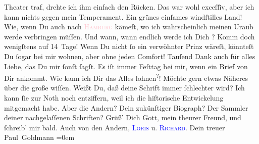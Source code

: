                Theater traf, drehte ich ihm einfach den Rücken. Das war wohl exceſſiv, aber ich kann
               nichts gegen mein Temperament.\pend
           \pstart
           Ein grünes einſames windſtilles Land! Wie, wenn Du auch nach \textsc{\textcolor{pink}{Hamburg}{}\ledrightnote{\textcolor{pink}{Hamburg}}} kämeſt, wo ich wahrscheinlich meinen Uraub werde verbringen müſſen. Und wann,
               wann endlich werde ich Dich \label{K_L02619-6v}\label{K_L02619-6h}? Komm doch
               wenigſtens auf 14 Tage! Wenn Du nicht ſo ein verwöhnter Prinz wäreſt, könnteſt Du
               ſogar bei mir wohnen, aber ohne jeden Comfort!\pend
           \pstart
           {\pb}Tauſend Dank auch für alles Liebe, das Du mir ſonſt
               ſagſt. Es iſt immer Feſttag bei mir, wenn ein Brief von Dir ankommt. Wie kann ich Dir
               das Alles lohnen\substVorne{}\textsuperscript{?}\substDazwischen{}!\substHinten{}\pend
           \pstart
           Möchte gern etwas Näheres über die große \label{K_L02619-444v}\label{K_L02619-444h} wiſſen.\pend
           \pstart
           Weißt Du, daß deine Schrift immer ſchlechter wird? Ich kann ſie zur Noth noch
               entziffern, weil ich die hiſtorische Entwickelung mitgemacht habe. Aber die Andern?
               Dein zukünftiger Biograph? Der Sammler deiner nachgelaſſenen Schriften?{\dotsfour}\pend
           \pstart
           Grüß’ Dich Gott, mein theurer Freund, und ſchreib’ mir bald. Auch von den Andern, \textsc{\textcolor{blue}{Loris}{}\ledrightnote{\textcolor{blue}{Hugo von Hofmannsthal}}} u. \textsc{\textcolor{blue}{Richard}{}\ledrightnote{\textcolor{blue}{Richard Beer-Hofmann}}}.\pend
           \pstart
           Dein treuer {\\[\baselineskip]}\spacefill\mbox{Paul Goldmann}\pend
           \leftskip=0em{}\endnumbering{}  
      